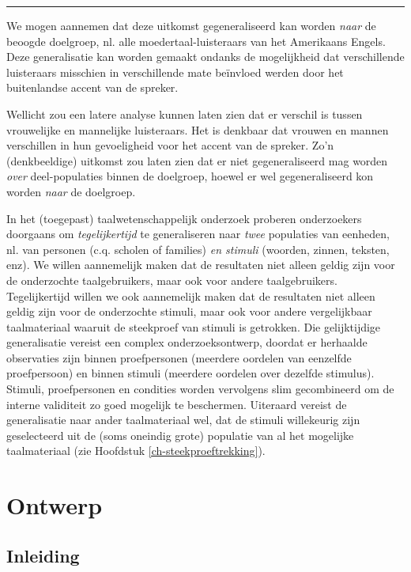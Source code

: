 \documentclass[
]{book}
\begin{document}
\begin{center}\rule{0.5\linewidth}{0.5pt}\end{center}

We mogen aannemen dat deze uitkomst gegeneraliseerd kan worden \emph{naar} de
beoogde doelgroep, nl. alle moedertaal-luisteraars van het Amerikaans
Engels. Deze generalisatie kan worden gemaakt ondanks de mogelijkheid
dat verschillende luisteraars misschien in verschillende mate beïnvloed
werden door het buitenlandse accent van de spreker.

Wellicht zou een latere analyse kunnen laten zien dat er verschil is
tussen vrouwelijke en mannelijke luisteraars. Het is denkbaar dat
vrouwen en mannen verschillen in hun gevoeligheid voor het accent van de
spreker. Zo'n (denkbeeldige) uitkomst zou laten zien dat er niet
gegeneraliseerd mag worden \emph{over} deel-populaties binnen de doelgroep,
hoewel er wel gegeneraliseerd kon worden \emph{naar} de doelgroep.

In het (toegepast) taalwetenschappelijk onderzoek proberen onderzoekers
doorgaans om \emph{tegelijkertijd} te generaliseren naar \emph{twee} populaties
van eenheden, nl. van personen (c.q. scholen of families) \emph{en stimuli}
(woorden, zinnen, teksten, enz). We willen aannemelijk maken dat de
resultaten niet alleen geldig zijn voor de onderzochte taalgebruikers,
maar ook voor andere taalgebruikers. Tegelijkertijd willen we ook
aannemelijk maken dat de resultaten niet alleen geldig zijn voor de
onderzochte stimuli, maar ook voor andere vergelijkbaar taalmateriaal
waaruit de steekproef van stimuli is getrokken. Die gelijktijdige
generalisatie vereist een complex onderzoeksontwerp, doordat er
herhaalde observaties zijn binnen proefpersonen (meerdere oordelen van
eenzelfde proefpersoon) en binnen stimuli (meerdere oordelen over
dezelfde stimulus). Stimuli, proefpersonen en condities worden
vervolgens slim gecombineerd om de interne validiteit zo goed mogelijk
te beschermen. Uiteraard vereist de generalisatie naar ander
taalmateriaal wel, dat de stimuli willekeurig zijn geselecteerd uit de
(soms oneindig grote) populatie van al het mogelijke taalmateriaal (zie
Hoofdstuk \ref{ch-steekproeftrekking}).

\chapter{Ontwerp}\label{ch-ontwerp}

\section{Inleiding}\label{sec:ontwerp-inleiding}
\end{document}
